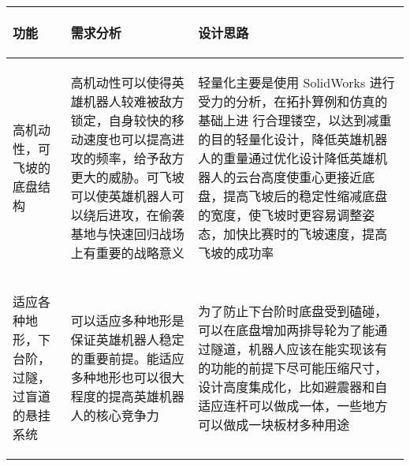
\begin{longtable}{ p{2cm} | p{7.8cm} | p{6cm} |}

    \hline

    \endfoot
    
    \rowcolor{tabhdcolor}

        \begin{center}
            功能
        \end{center} &
        \begin{center}
            需求分析
        \end{center} &
        \begin{center}
            设计思路
        \end{center} \\

    \hline

    \endhead

        \begin{center}
            高机动性，可飞坡的底盘结构
        \end{center} &
        \begin{center}
            高机动性可以使得英雄机器人较难被敌方锁定，自身较快的移动速度也可以提高进攻的频率，给予敌方更大的威胁。可飞坡可以使英雄机器人可以绕后进攻，在偷袭基地与快速回归战场上有重要的战略意义
        \end{center} &
        \begin{center}
            轻量化主要是使用 SolidWorks 进行受力的分析，在拓扑算例和仿真的基础上进 行合理镂空，以达到减重的目的轻量化设计，降低英雄机器人的重量通过优化设计降低英雄机器人的云台高度使重心更接近底盘，提高飞坡后的稳定性缩减底盘的宽度，使飞坡时更容易调整姿态，加快比赛时的飞坡速度，提高飞坡的成功率
        \end{center} \\
        
    \hline

        \begin{center}
            适应各种地形，下台阶，过隧，过盲道的悬挂系统
        \end{center} &
        \begin{center}
            可以适应多种地形是保证英雄机器人稳定的重要前提。能适应多种地形也可以很大程度的提高英雄机器人的核心竞争力
        \end{center} &
        \begin{center}
            为了防止下台阶时底盘受到磕碰，可以在底盘增加两排导轮为了能通过隧道，机器人应该在能实现该有的功能的前提下尽可能压缩尺寸，设计高度集成化，比如避震器和自适应连杆可以做成一体，一些地方可以做成一块板材多种用途
        \end{center} \\
        

\end{longtable}
